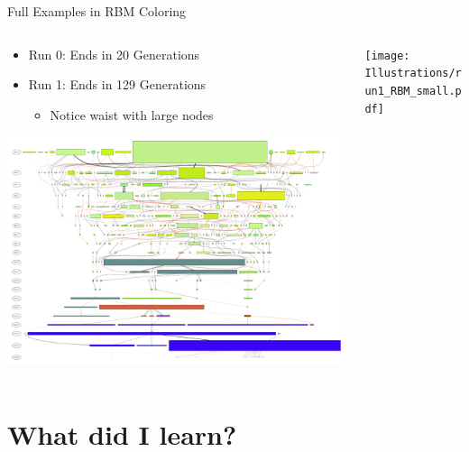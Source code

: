 \documentclass{beamer}
\begin{document}
\begin{frame}{Full Examples in RBM Coloring}
\begin{columns}
\begin{column}{.6\textwidth}
\center
\begin{itemize}
\item Run 0: Ends in 20 Generations
\item Run 1: Ends in 129 Generations
\begin{itemize}
\item Notice waist with large nodes
\end{itemize}
\end{itemize}
\includegraphics[width=\textwidth]{Illustrations/run0_RBM_color_full_30000.pdf} 
\end{column}
\begin{column}{.45\textwidth}
\center
\texttt{[image: Illustrations/run1\_RBM\_small.pdf]} 
\end{column}
\end{columns}
\end{frame}


\section{What did I learn?}
\end{document}
